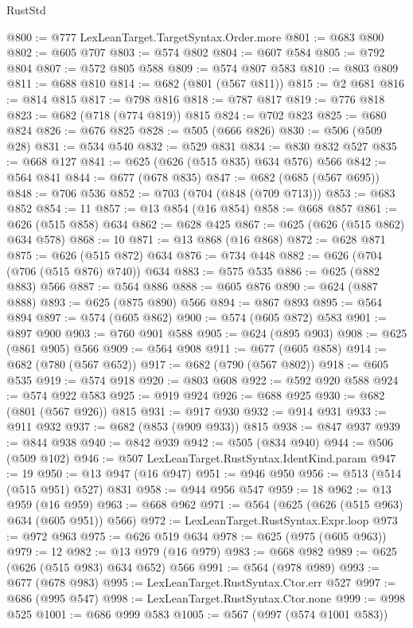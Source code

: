 \begin{lexlean}{RustStd}
\begin{coremodule}
@800 := @777 LexLeanTarget.TargetSyntax.Order.more
@801 := @683 @800
@802 := @605 @707
@803 := @574 @802
@804 := @607 @584
@805 := @792 @804
@807 := @572 @805 @588
@809 := @574 @807 @583
@810 := @803 @809
@811 := @688 @810
@814 := @682 (@801 (@567 @811))
@815 := @2 @681
@816 := @814 @815
@817 := @798 @816
@818 := @787 @817
@819 := @776 @818
@823 := @682 (@718 (@774 @819)) @815
@824 := @702 @823
@825 := @680 @824
@826 := @676 @825
@828 := @505 (@666 @826)
@830 := @506 (@509 @28)
@831 := @534 @540
@832 := @529 @831
@834 := @830 @832 @527
@835 := @668 @127
@841 := @625 (@626 (@515 @835) @634 @576) @566
@842 := @564 @841
@844 := @677 (@678 @835)
@847 := @682 (@685 (@567 @695))
@848 := @706 @536
@852 := @703 (@704 (@848 (@709 @713)))
@853 := @683 @852
@854 := 11
@857 := @13 @854 (@16 @854)
@858 := @668 @857
@861 := @626 (@515 @858) @634
@862 := @628 @425
@867 := @625 (@626 (@515 @862) @634 @578)
@868 := 10
@871 := @13 @868 (@16 @868)
@872 := @628 @871
@875 := @626 (@515 @872) @634
@876 := @734 @448
@882 := @626 (@704 (@706 (@515 @876) @740)) @634
@883 := @575 @535
@886 := @625 (@882 @883) @566
@887 := @564 @886
@888 := @605 @876
@890 := @624 (@887 @888)
@893 := @625 (@875 @890) @566
@894 := @867 @893
@895 := @564 @894
@897 := @574 (@605 @862)
@900 := @574 (@605 @872) @583
@901 := @897 @900
@903 := @760 @901 @588
@905 := @624 (@895 @903)
@908 := @625 (@861 @905) @566
@909 := @564 @908
@911 := @677 (@605 @858)
@914 := @682 (@780 (@567 @652))
@917 := @682 (@790 (@567 @802))
@918 := @605 @535
@919 := @574 @918
@920 := @803 @608
@922 := @592 @920 @588
@924 := @574 @922 @583
@925 := @919 @924
@926 := @688 @925
@930 := @682 (@801 (@567 @926)) @815
@931 := @917 @930
@932 := @914 @931
@933 := @911 @932
@937 := @682 (@853 (@909 @933)) @815
@938 := @847 @937
@939 := @844 @938
@940 := @842 @939
@942 := @505 (@834 @940)
@944 := @506 (@509 @102)
@946 := @507 LexLeanTarget.RustSyntax.IdentKind.param
@947 := 19
@950 := @13 @947 (@16 @947)
@951 := @946 @950
@956 := @513 (@514 (@515 @951) @527) @831
@958 := @944 @956 @547
@959 := 18
@962 := @13 @959 (@16 @959)
@963 := @668 @962
@971 := @564 (@625 (@626 (@515 @963) @634 (@605 @951)) @566)
@972 := LexLeanTarget.RustSyntax.Expr.loop
@973 := @972 @963
@975 := @626 @519 @634
@978 := @625 (@975 (@605 @963))
@979 := 12
@982 := @13 @979 (@16 @979)
@983 := @668 @982
@989 := @625 (@626 (@515 @983) @634 @652) @566
@991 := @564 (@978 @989)
@993 := @677 (@678 @983)
@995 := LexLeanTarget.RustSyntax.Ctor.err @527
@997 := @686 (@995 @547)
@998 := LexLeanTarget.RustSyntax.Ctor.none
@999 := @998 @525
@1001 := @686 @999 @583
@1005 := @567 (@997 (@574 @1001 @583))

\end{coremodule}
\end{lexlean}
